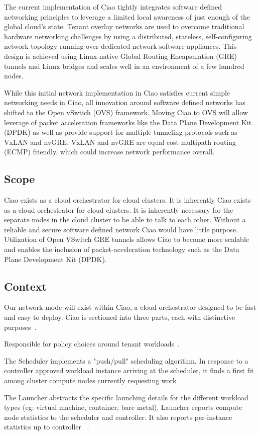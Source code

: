 \documentclass[10pt,onecolumn,journal,draftclsnofoot]{IEEEtran}
\begin{document}
The current implementation of Ciao tightly integrates software defined
networking principles to leverage a limited local awareness of just enough of
the global cloud's state. Tenant overlay networks are used to overcome
traditional hardware networking challenges by using a distributed, stateless,
self-configuring network topology running over dedicated network software
appliances. This design is achieved using Linux-native Global Routing
Encapsulation (GRE) tunnels and Linux bridges and scales well in an environment
of a few hundred nodes.

While this initial network implementation in Ciao satisfies current simple
networking needs in Ciao, all innovation around software defined networks has
shifted to the Open vSwtich (OVS) framework. Moving Ciao to OVS will allow
leverage of packet acceleration frameworks like the Data Plane Development Kit
(DPDK) as well as provide support for multiple tunneling protocols such as VxLAN
and nvGRE. VxLAN and nvGRE are equal cost multipath routing (ECMP) friendly,
which could increase network performance overall.

\subsection{Scope}

Ciao exists as a cloud orchestrator for cloud clusters. It is inherently Ciao
exists as a cloud orchestrator for cloud clusters. It is inherently necessary
for the separate nodes in the cloud cluster to be able to talk to each other.
Without a reliable and secure software defined network Ciao would have little
purpose. Utilization of Open VSwitch GRE tunnels allows Ciao to become more
scalable and enables the inclusion of packet-acceleration technology such as the
Data Plane Development Kit (DPDK).

\subsection{Context}

Our network mode will exist within Ciao, a cloud orchestrator designed to be
fast and easy to deploy. Ciao is sectioned into three parts, each with
distinctive purposes~\cite{ciao}.

\begin{description}[leftmargin=12em,style=nextline]
	\item[Controller]
		Responsible for policy choices around tenant
		workloads~\cite{ciao}.
	\item[Scheduler]
		The Scheduler implements a "push/pull" scheduling algorithm. In
		response to a controller approved workload instance arriving at
		the scheduler, it finds a first fit among cluster compute nodes
		currently requesting work~\cite{ciao}.
	\item[Launcher]
		The Launcher abstracts the specific launching details for the
		different workload types (eg: virtual machine, container, bare
		metal). Launcher reports compute node statistics to the
		scheduler and controller. It also reports per-instance
		statistics up to controller ~\cite{ciao}.
\end{description}
\end{document}
